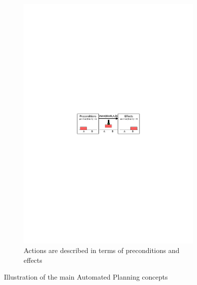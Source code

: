 \begin{figure}[htp]
\begin{subfigure}[t]{0.44\textwidth}
		\includegraphics[width=\textwidth]{figures/schema-logic-1}
		\caption{Actions are described in terms of preconditions and effects}
		\label{fig:Planning action}
	\end{subfigure}
	\caption{Illustration of the main Automated Planning concepts}
	\label{fig:Planning domain and action}
\end{figure}

